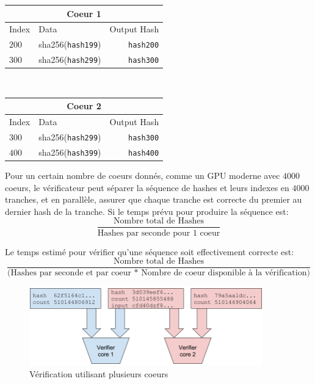 \documentclass[12pt]{article}
\begin{document}
\begin{center}

\begin{tabular}{l l r}
    \multicolumn{3}{c}{Coeur 1} \\ \hline
    Index & Data & Output Hash \\ \hline
    $200$ & sha256(\texttt{hash199}) & \texttt{hash200} \\
    $300$ & sha256(\texttt{hash299}) & \texttt{hash300}\\
    \end{tabular}\\

  \begin{tabular}{l l r}
    \multicolumn{3}{c}{Coeur 2} \\
    \hline
    Index & Data & Output Hash \\ \hline
    $300$ & sha256(\texttt{hash299}) & \texttt{hash300} \\
    $400$ & sha256(\texttt{hash399}) & \texttt{hash400}\\
    \end{tabular}

\end{center}


Pour un certain nombre de coeurs donnés, comme un GPU moderne avec $4000$ coeurs, le vérificateur peut séparer la séquence de hashes et leurs indexes en $4000$ tranches, et en parallèle, assurer que chaque tranche est correcte du premier au dernier hash de la tranche. Si le temps prévu pour produire la séquence est:\\


\[
\frac{\textrm{Nombre total de Hashes}}{\textrm{Hashes par seconde pour 1 coeur}}
\]

\noindent Le temps estimé pour vérifier qu’une séquence soit effectivement correcte est:\\

\[
\frac{\textrm{Nombre total de Hashes}}{\textrm{(Hashes par seconde et par coeur * Nombre de coeur disponible à la vérification)}}
\]

\begin{figure}
  \begin{center}
    \centering
    \includegraphics[width=0.9\textwidth]{figures/fig_4.png}
    \caption[Figure 4]{Vérification utilisant plusieurs coeurs\label{fig:poh_verification}}
  \end{center}
  \end{figure}
\end{document}
